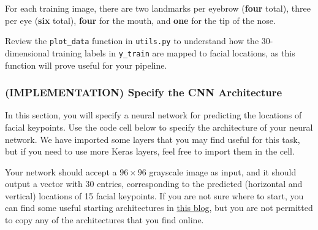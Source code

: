 \documentclass[11pt]{article}
\begin{document}
    For each training image, there are two landmarks per eyebrow
(\textbf{four} total), three per eye (\textbf{six} total), \textbf{four}
for the mouth, and \textbf{one} for the tip of the nose.

Review the \texttt{plot\_data} function in \texttt{utils.py} to
understand how the 30-dimensional training labels in \texttt{y\_train}
are mapped to facial locations, as this function will prove useful for
your pipeline.

    \hypertarget{implementation-specify-the-cnn-architecture}{%
\subsubsection{(IMPLEMENTATION) Specify the CNN
Architecture}\label{implementation-specify-the-cnn-architecture}}

In this section, you will specify a neural network for predicting the
locations of facial keypoints. Use the code cell below to specify the
architecture of your neural network. We have imported some layers that
you may find useful for this task, but if you need to use more Keras
layers, feel free to import them in the cell.

Your network should accept a \(96 \times 96\) grayscale image as input,
and it should output a vector with 30 entries, corresponding to the
predicted (horizontal and vertical) locations of 15 facial keypoints. If
you are not sure where to start, you can find some useful starting
architectures in
\href{http://danielnouri.org/notes/2014/12/17/using-convolutional-neural-nets-to-detect-facial-keypoints-tutorial/}{this
blog}, but you are not permitted to copy any of the architectures that
you find online.
\end{document}
